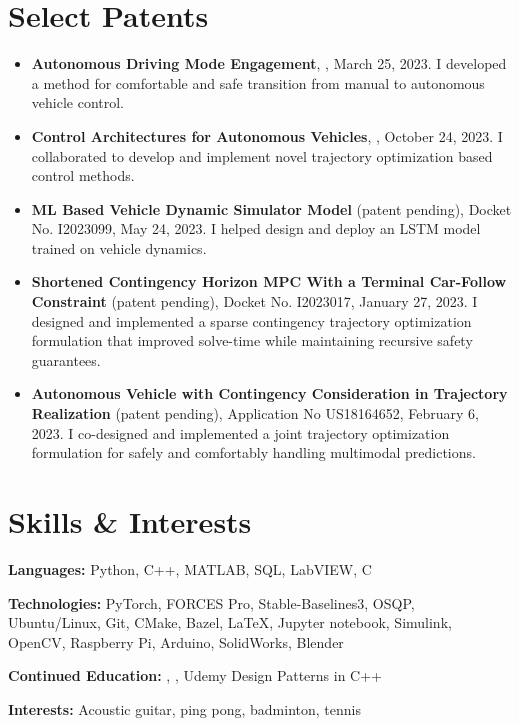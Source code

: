 \documentclass[letterpaper,11pt]{article}
\def\vspaceAfterBullets{3pt} %
\newcommand{\bulletItem}[1]{
  \item\small{
    {#1}
  }
}
\newcommand{\sectionListStart}{\begin{itemize}[leftmargin=0pt, label={}]}
\newcommand{\sectionListEnd}{\end{itemize}}
\newcommand{\bref}[2]{\href{#1}{\color{blue}{#2}}}
\begin{document}
\section{Select Patents}
\begin{itemize}[leftmargin=15pt]
  \bulletItem{\textbf{Autonomous Driving Mode Engagement}, \bref{https://patents.google.com/patent/US20230159063A1/en?oq=US20230159063A}{US patent US20230159063A1}, March 25, 2023. I developed a method for comfortable and safe transition from manual to autonomous vehicle control.}
  \bulletItem{\textbf{Control Architectures for Autonomous Vehicles}, \bref{https://patents.google.com/patent/US11794775B2/en?oq=US11794775B2}{US patent US11794775B2}, October 24, 2023. I collaborated to develop and implement novel trajectory optimization based control methods.}
  \bulletItem{\textbf{ML Based Vehicle Dynamic Simulator Model} (patent pending), Docket No. I2023099, May 24, 2023. I helped design and deploy an LSTM model trained on vehicle dynamics.}
  \bulletItem{\textbf{Shortened Contingency Horizon MPC With a Terminal Car-Follow Constraint} (patent pending), Docket No. I2023017, January 27, 2023. I designed and implemented a sparse contingency trajectory optimization formulation that improved solve-time while maintaining recursive safety guarantees.}
  \bulletItem{\textbf{Autonomous Vehicle with Contingency Consideration in Trajectory Realization} (patent pending), Application No US18164652, February 6, 2023. I co-designed and implemented a joint trajectory optimization formulation for safely and comfortably handling multimodal predictions.}
\end{itemize}


\section{Skills \& Interests}
\sectionListStart
\small{\item{

              \textbf{Languages:}{ Python, C++, MATLAB, SQL, LabVIEW, C} \\ \vspace{\vspaceAfterBullets}

              \textbf{Technologies:}{ PyTorch, FORCES Pro, Stable-Baselines3, OSQP, Ubuntu/Linux, Git, CMake, Bazel, \LaTeX, Jupyter notebook, Simulink, OpenCV, Raspberry Pi, Arduino, SolidWorks, Blender} \\ \vspace{\vspaceAfterBullets}

              \textbf{Continued Education:}{ \bref{https://github.com/jam643/CS285DeepRL/tree/master}{Deep Reinforcement Learning CS285}, \bref{https://github.com/jam643/UnderactuatedRobotics-6p832-JesseM}{Underactuated Robotics MIT 6.832}, Udemy Design Patterns in C++} \\ \vspace{\vspaceAfterBullets}

              \textbf{Interests:}{ Acoustic guitar, ping pong, badminton, tennis} \\ \vspace{\vspaceAfterBullets}

        }}
\sectionListEnd
\end{document}

